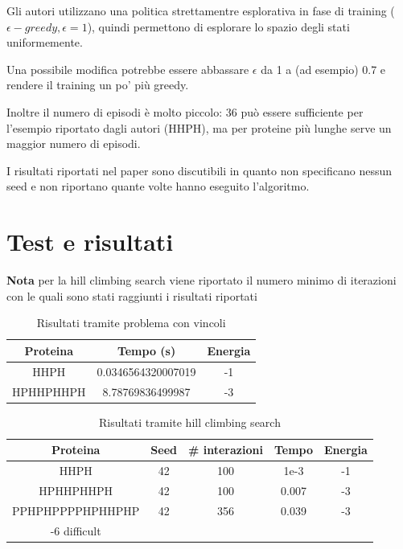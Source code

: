 \documentclass[conference]{IEEEtran}
\begin{document}
Gli autori utilizzano una politica strettamentre esplorativa in fase di training ($\epsilon-greedy, \epsilon = 1$), quindi permettono di esplorare lo spazio degli stati uniformemente.

Una possibile modifica potrebbe essere abbassare $\epsilon$ da 1 a (ad esempio) 0.7 e rendere il training un po' più greedy.

Inoltre il numero di episodi è molto piccolo: 36 può essere sufficiente per l'esempio riportato dagli autori (HHPH), ma per proteine più lunghe serve un maggior numero di episodi.

I risultati riportati nel paper sono discutibili in quanto non specificano nessun seed e non riportano quante volte hanno eseguito l'algoritmo.

\section{Test e risultati}

\textbf{Nota} per la hill climbing search viene riportato il numero minimo di iterazioni con le quali sono stati raggiunti i risultati riportati

\begin{table}[h]
\begin{center}
\begin{tabular}{|c|c|c|}
\hline
\textbf{Proteina} & \textbf{Tempo (s)} & \textbf{Energia} \\ \hline
HHPH & 0.0346564320007019 & -1 \\ \hline
HPHHPHHPH & 8.78769836499987 & -3 \\ \hline
\end{tabular}
\caption{Risultati tramite problema con vincoli}
\end{center}
\end{table}

\begin{table}[h]
\begin{center}
\begin{tabular}{|c|c|c|c|c|}
\hline
\textbf{Proteina} & \textbf{Seed} & \textbf{\# interazioni} & \textbf{Tempo} & \textbf{Energia} \\ \hline
HHPH & 42 & 100 & 1e-3 & -1 \\ \hline
HPHHPHHPH & 42 & 100 & 0.007 & -3 \\ \hline
PPHPHPPPPHPHHPHP & 42 & 356 & 0.039 & -3 \\ \hline
-6 difficult
\end{tabular}
\caption{Risultati tramite hill climbing search}
\end{center}
\end{table}
\end{document}
